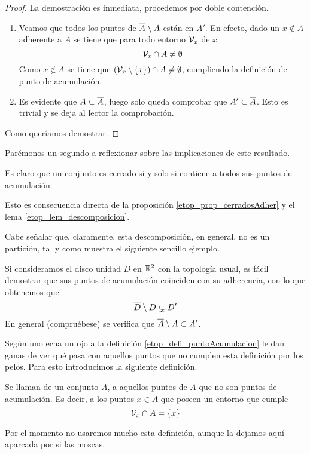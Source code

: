 \begin{proof}
	La demostración es inmediata, procedemos por doble contención.
	\begin{enumerate}
		\item[\bsubset] Veamos que todos los puntos de $\overline{A}\setminus A$ están en $A'$. En efecto, dado un $x\not\in A$ adherente a $A$ se tiene que para todo entorno $\mathcal{V}_x$ de $x$
		\begin{equation*}
		\mathcal{V}_x\cap A\not=\emptyset
		\end{equation*}
		Como $x\not\in A$ se tiene que $(\mathcal{V}_x\setminus\{x\})\cap A\not=\emptyset$, cumpliendo la definición de punto de acumulación.
		\item[\bsupset] Es evidente que $A\subset\overline{A}$, luego solo queda comprobar que $A'\subset \overline{A}$. Esto es trivial y se deja al lector la comprobación.
	\end{enumerate}
	Como queríamos demostrar.
\end{proof}
Parémonos un segundo a reflexionar sobre las implicaciones de este resultado.
\begin{obs}
	Es claro que un conjunto es cerrado si y solo si contiene a todos sus puntos de acumulación.
	
	Esto es consecuencia directa de la proposición \ref{etop_prop_cerradosAdher} y el lema \ref{etop_lem_descomposicion}.
\end{obs}
Cabe señalar que, claramente, esta descomposición, en general, no es un partición, tal y como muestra el siguiente sencillo ejemplo.
\begin{exa}[Disco]
	Si consideramos el disco unidad $D$ en $\mathbb{R}^2$ con la topología usual, es fácil demostrar que sus puntos de acumulación coinciden con su adherencia, con lo que obtenemos que
	\begin{equation}
	\overline{D}\setminus D \subsetneq D'
	\end{equation}
	En general (compruébese) se verifica que $\overline{A}\setminus A\subset A'$.
\end{exa}
Según uno echa un ojo a la definición \ref{etop_defi_puntoAcumulacion} le dan ganas de ver qué pasa con aquellos puntos que no cumplen esta definición por los pelos. Para esto introducimos la siguiente definición.
\begin{defi}
	Se llaman  de un conjunto $A$, a aquellos puntos de $A$ que no son puntos de acumulación. Es decir, a los puntos $x\in A$ que poseen un entorno que cumple
	\begin{equation*}
	\mathcal{V}_x\cap A = \{x\}
	\end{equation*}
\end{defi}
Por el momento no usaremos mucho esta definición, aunque la dejamos aquí aparcada por si las moscas.

